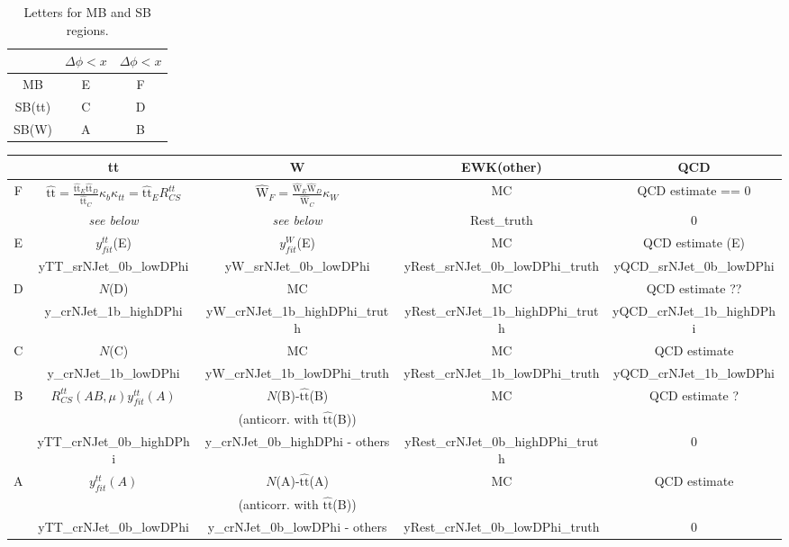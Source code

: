 \documentclass[12pt,a4paper]{article}
\begin{document}
\newcommand{\tthat}{\ensuremath{\widehat{\mathrm{tt}}}}
\newcommand{\what}{\ensuremath{\widehat{\mathrm{W}}}}

\begin{table}
\center
\begin{tabular}{c||c|c}
 & $\Delta\phi<x$ &  $\Delta\phi<x$ \\ \hline\hline
MB & E & F \\ 
SB(tt) & C & D \\
SB(W) & A & B 
\end{tabular}
\caption{Letters for MB and SB regions.}
\end{table}

\begin{sidewaystable}
\center
\begin{tabular}{c||c|c|c|c}
   & tt & W & EWK(other) & QCD \\ \hline\hline
F & $\tthat = \frac{\tthat_E \tthat_D}{\tthat_C} \kappa_b \kappa_{tt} = \tthat_E R_{CS}^{tt}$ & 
$\what_F = \frac{\what_E \what_D}{\what_C} \kappa_{W}$ & MC & QCD estimate == 0 \\ \hline
  & {\it see below} & {\it see below} & Rest\_truth & 0  \\ \hline \hline
E & $y_{fit}^{tt}$(E) & $y_{fit}^{W}$(E) & MC & QCD estimate (E) \\ \hline
 & yTT\_srNJet\_0b\_lowDPhi & yW\_srNJet\_0b\_lowDPhi & yRest\_srNJet\_0b\_lowDPhi\_truth & yQCD\_srNJet\_0b\_lowDPhi \\ \hline \hline
D & $N$(D) & MC & MC & QCD estimate ?? \\ \hline 
 & y\_crNJet\_1b\_highDPhi & yW\_crNJet\_1b\_highDPhi\_truth & yRest\_crNJet\_1b\_highDPhi\_truth & yQCD\_crNJet\_1b\_highDPhi \\ \hline \hline
C & $N$(C) & MC & MC & QCD estimate \\ \hline 
 & y\_crNJet\_1b\_lowDPhi & yW\_crNJet\_1b\_lowDPhi\_truth & yRest\_crNJet\_1b\_lowDPhi\_truth & yQCD\_crNJet\_1b\_lowDPhi \\ \hline \hline
B & $R_{CS}^{tt}(AB,\mu) y_{fit}^{tt}(A)$ & $N$(B)-\tthat(B) & MC & QCD estimate ? \\ 
  & & (anticorr. with \tthat(B)) & & \\ \hline 
  & yTT\_crNJet\_0b\_highDPhi & y\_crNJet\_0b\_highDPhi - others & yRest\_crNJet\_0b\_highDPhi\_truth & 0 \\ \hline \hline
A & $y_{fit}^{tt}(A)$ & $N$(A)-\tthat(A) & MC & QCD estimate \\ 
  & & (anticorr. with \tthat(B)) & & \\ \hline 
  & yTT\_crNJet\_0b\_lowDPhi & y\_crNJet\_0b\_lowDPhi - others & yRest\_crNJet\_0b\_lowDPhi\_truth& 0 \\ \hline \hline
\end{tabular}
\end{sidewaystable}
\end{document}
